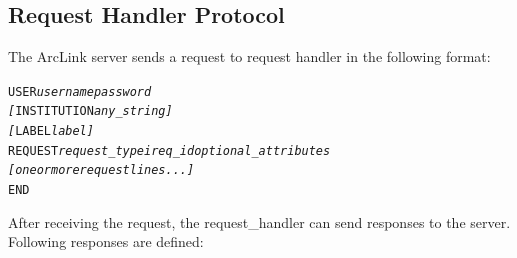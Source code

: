 \documentclass[11pt,a4paper,titlepage]{article}
\begin{document}
\subsection{Request Handler Protocol}\label{reqhandler}

The ArcLink server sends a request to request handler in the following
format:

\begin{alltt}
USER \textnormal{\emph{username}} \textnormal{\emph{password}}
\textnormal{\emph{[}}INSTITUTION \textnormal{\emph{any_string]}}
\textnormal{\emph{[}L}ABEL \textnormal{\emph{label]}}
REQUEST \textnormal{\emph{request\_typei req\_id optional\_attributes}}
\textnormal{\emph{[one or more request lines...]}}
END
\end{alltt}

After receiving the request, the request\_handler can send responses to the
server. Following responses are defined:

\newcommand{\stcode}[1]{\textnormal{\texttt{#1}}}
\end{document}
